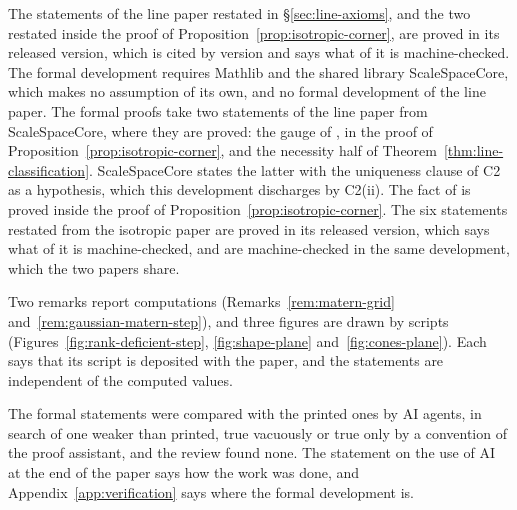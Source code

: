 The statements of the line paper restated in
\S\ref{sec:line-axioms}, and the two restated inside the proof of
Proposition~\ref{prop:isotropic-corner}, are proved in its released version, which is cited by
version and says what of it is machine-checked. The formal development
requires Mathlib and the shared library ScaleSpaceCore, which makes no assumption of its own, and no
formal development of the line paper. The formal proofs take two statements of the line paper from
ScaleSpaceCore, where they are proved: the gauge of , in the proof of
Proposition~\ref{prop:isotropic-corner}, and the necessity half of
Theorem~\ref{thm:line-classification}. ScaleSpaceCore states the latter with the uniqueness clause of
C2 as a hypothesis, which this development discharges by C2(ii). The fact of  is proved inside the proof of
Proposition~\ref{prop:isotropic-corner}. The six
statements restated from the isotropic paper are proved in its released version, which says what of
it is machine-checked, and are machine-checked in the same development, which the two papers share.

Two remarks report computations
(Remarks~\ref{rem:matern-grid} and~\ref{rem:gaussian-matern-step}), and three figures are drawn by
scripts (Figures~\ref{fig:rank-deficient-step}, \ref{fig:shape-plane} and~\ref{fig:cones-plane}). Each says that its script is
deposited with the paper, and the statements are independent of the computed values.

The formal statements were compared with the printed ones by AI agents, in search of one weaker than
printed, true vacuously or true only by a convention of the proof assistant, and the review found
none. The statement on the use of AI at the end of the paper says how the work was done, and
Appendix~\ref{app:verification} says where the formal development is.
